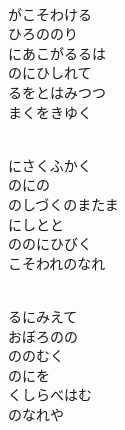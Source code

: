 \documentclass[10pt,b5j]{tarticle} %
\begin{document}
\vspace{1.5em} %
\newcommand{\linespace}{0.5em} %
\newcommand{\blocksize}{0.5\hsize} %
\newcommand{\itemmargin}{6em} %
\begin{enumerate} %
    \setlength{\itemindent}{\itemmargin} %
    \begin{minipage}[c]{\blocksize}
    
        \vspace{\linespace}
        \item~\\
        がこそわける\\
        ひろののり\\
        にあこがるるは\\
        のにひしれて\\
        るをとはみつつ\\
        まくをきゆく
        
        \vspace{\linespace}
        \item~\\
        にさくふかく\\
        のにの\\
        のしづくのまたま\\
        にしとと\\
        ののにひびく\\
        こそわれのなれ
        
        \vspace{\linespace}
        \item~\\
        るにみえて\\
        おぼろのの\\
        ののむく\\
        のにを\\
        くしらべはむ\\
        のなれや
        

\end{minipage}
\end{enumerate}
\end{document}
